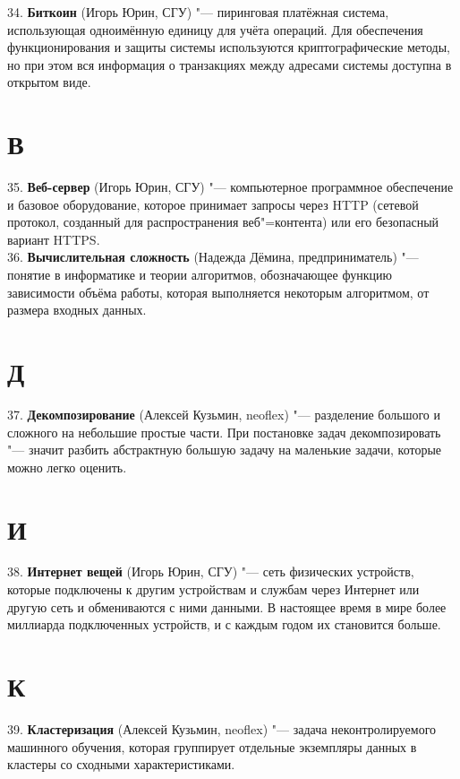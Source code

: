 \documentclass[14 pt]{extarticle}
\begin{document}
    34. \textbf{Биткоин} (Игорь Юрин, СГУ) "--- пиринговая платёжная система, использующая одноимённую единицу для учёта операций. Для обеспечения функционирования и защиты системы используются криптографические методы, но при этом вся информация о транзакциях между адресами системы доступна в открытом виде. \\
    
\section*{В}
    35. \textbf{Веб-сервер} (Игорь Юрин, СГУ) "--- компьютерное программное обеспечение и базовое оборудование, которое принимает запросы через HTTP (сетевой протокол, созданный для распространения веб"=контента) или его безопасный вариант HTTPS. \\
    
    36. \textbf{Вычислительная сложность} (Надежда Дёмина, предприниматель) "--- понятие в информатике и теории алгоритмов, обозначающее функцию зависимости объёма работы, которая выполняется некоторым алгоритмом, от размера входных данных. \\
    
\section*{Д}
    37. \textbf{Декомпозирование} (Алексей Кузьмин, neoflex) "--- разделение большого и сложного на небольшие простые части. При постановке задач декомпозировать "--- значит разбить абстрактную большую задачу на маленькие задачи, которые можно легко оценить. \\
    
\section*{И}
    38. \textbf{Интернет вещей} (Игорь Юрин, СГУ) "--- сеть физических устройств, которые подключены к другим устройствам и службам через Интернет или другую сеть и обмениваются с ними данными. В настоящее время в мире более миллиарда подключенных устройств, и с каждым годом их становится больше. \\
    
\section*{К}
    39. \textbf{Кластеризация} (Алексей Кузьмин, neoflex) "--- задача неконтролируемого машинного обучения, которая группирует отдельные экземпляры данных в кластеры со сходными характеристиками. \\
    
\end{document}

